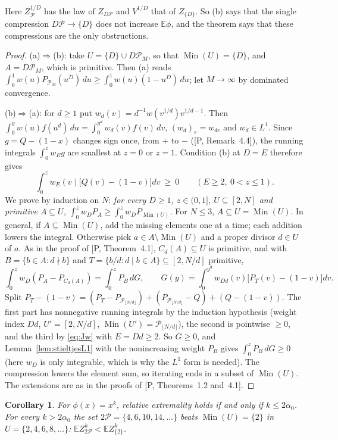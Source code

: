 \documentclass[11pt]{article}
\newtheorem{corollary}[theorem]{Corollary}
\theoremstyle{remark}
\newcommand{\Prm}{\mathcal{P}}
\newcommand{\E}{\mathbb{E}}
\newcommand{\Min}{\operatorname{Min}}
\begin{document}
Here $Z_\Prm^{1/D}$ has the law of $Z_{D\Prm}$ and $V^{1/D}$ that of $Z_{\{D\}}$. So (b) says that
the single compression $D\Prm\to\{D\}$ does not increase $\E\phi$, and the theorem says that
these compressions are the only obstructions.

\begin{proof}
(a)$\Rightarrow$(b): take $U=\{D\}\cup D\Prm_M$, so that $\Min(U)=\{D\}$, and $A=D\Prm_M$, which is
primitive. Then (a) reads $\int_0^1w(u)P_{\Prm_M}(u^D)\,du\ge\int_0^1w(u)(1-u^D)\,du$; let
$M\to\infty$ by dominated convergence.

(b)$\Rightarrow$(a): for $d\ge1$ put $w_d(v)=d^{-1}w(v^{1/d})v^{1/d-1}$. Then
$\int_0^yw(u)f(u^d)\,du=\int_0^{y^d}w_d(v)f(v)\,dv$, $(w_d)_e=w_{de}$ and $w_d\in L^1$. Since
$g=Q-(1-x)$ changes sign once, from $+$ to $-$ ([P, Remark~4.4]), the running integrals
$\int_0^zw_Eg$ are smallest at $z=0$ or $z=1$. Condition (b) at $D=E$ therefore gives
\begin{equation}\label{eq:Jw}
\int_0^zw_E(v)\bigl[Q(v)-(1-v)\bigr]dv\ \ge\ 0\qquad(E\ge2,\ 0<z\le1).
\end{equation}
We prove by induction on $N$: \emph{for every $D\ge1$, $z\in(0,1]$, $U\subseteq[2,N]$ and primitive
$A\subseteq U$, $\int_0^zw_DP_A\ge\int_0^zw_DP_{\Min(U)}$.} For $N\le3$, $A\subseteq U=\Min(U)$.
In general, if $A\subseteq\Min(U)$, add the missing elements one at a time; each addition
lowers the integral. Otherwise pick $a\in A\setminus\Min(U)$ and a proper divisor $d\in U$ of
$a$. As in the proof of [P, Theorem~4.1], $C_d(A)\subseteq U$ is primitive, and with
$B=\{b\in A:d\nmid b\}$ and $T=\{b/d:d\mid b\in A\}\subseteq[2,N/d]$ primitive,
\[
\int_0^zw_D(P_A-P_{C_d(A)})=\int_0^zP_B\,dG,\qquad
G(y)=\int_0^{y^d}w_{Dd}(v)\bigl[P_T(v)-(1-v)\bigr]dv .
\]
Split $P_T-(1-v)=(P_T-P_{\Prm_{\lfloor N/d\rfloor}})+(P_{\Prm_{\lfloor N/d\rfloor}}-Q)+(Q-(1-v))$.
The first part has nonnegative running integrals by the induction hypothesis (weight index
$Dd$, $U'=[2,N/d]$, $\Min(U')=\Prm_{\lfloor N/d\rfloor}$), the second is pointwise $\ge0$, and the
third by \eqref{eq:Jw} with $E=Dd\ge2$. So $G\ge0$, and Lemma~\ref{lem:stieltjesL1} with the
nonincreasing weight $P_B$ gives $\int_0^zP_B\,dG\ge0$ (here $w_D$ is only integrable, which is
why the $L^1$ form is needed). The compression lowers the element sum, so iterating
ends in a subset of $\Min(U)$. The extensions are as in the proofs of [P, Theorems~1.2
and~4.1].
\end{proof}

\begin{corollary}\label{cor:2alpha}
For $\phi(x)=x^k$, relative extremality holds if and only if $k\le2\alpha_0$. For every
$k>2\alpha_0$ the set $2\Prm=\{4,6,10,14,\dots\}$ beats $\Min(U)=\{2\}$ in $U=\{2,4,6,8,\dots\}$:
$\E Z_{2\Prm}^k<\E Z_{\{2\}}^k$.
\end{corollary}
\end{document}
